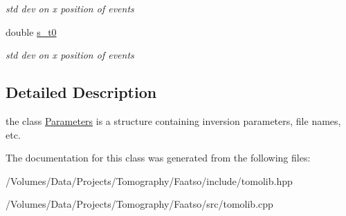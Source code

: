 \begin{DoxyCompactItemize}
\begin{DoxyCompactList}\small\item\em std dev on x position of events \end{DoxyCompactList}\item 
\hypertarget{class_parameters_af0981e025f8ca9c984e862eb7778e498}{}double \hyperlink{class_parameters_af0981e025f8ca9c984e862eb7778e498}{s\+\_\+t0}\label{class_parameters_af0981e025f8ca9c984e862eb7778e498}

\begin{DoxyCompactList}\small\item\em std dev on x position of events \end{DoxyCompactList}\end{DoxyCompactItemize}


\subsection{Detailed Description}
the class \hyperlink{class_parameters}{Parameters} is a structure containing inversion parameters, file names, etc. 

The documentation for this class was generated from the following files\+:\begin{DoxyCompactItemize}
\item 
/\+Volumes/\+Data/\+Projects/\+Tomography/\+Faatso/include/tomolib.\+hpp\item 
/\+Volumes/\+Data/\+Projects/\+Tomography/\+Faatso/src/tomolib.\+cpp\end{DoxyCompactItemize}
